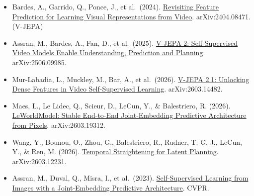 \vspace{0.25em}
\begin{itemize}
\tightlist
\item
  Bardes, A., Garrido, Q., Ponce, J., et al.~(2024). \href{https://arxiv.org/abs/2404.08471}{Revisiting Feature Prediction for Learning Visual Representations from Video}. arXiv:2404.08471. (V-JEPA)
\item
  Assran, M., Bardes, A., Fan, D., et al.~(2025). \href{https://arxiv.org/abs/2506.09985}{V-JEPA 2: Self-Supervised Video Models Enable Understanding, Prediction and Planning}. arXiv:2506.09985.
\item
  Mur-Labadia, L., Muckley, M., Bar, A., et al.~(2026). \href{https://arxiv.org/abs/2603.14482}{V-JEPA 2.1: Unlocking Dense Features in Video Self-Supervised Learning}. arXiv:2603.14482.
\item
  Maes, L., Le Lidec, Q., Scieur, D., LeCun, Y., \& Balestriero, R. (2026). \href{https://arxiv.org/abs/2603.19312}{LeWorldModel: Stable End-to-End Joint-Embedding Predictive Architecture from Pixels}. arXiv:2603.19312.
\item
  Wang, Y., Bounou, O., Zhou, G., Balestriero, R., Rudner, T. G. J., LeCun, Y., \& Ren, M. (2026). \href{https://arxiv.org/abs/2603.12231}{Temporal Straightening for Latent Planning}. arXiv:2603.12231.
\item
  Assran, M., Duval, Q., Misra, I., et al.~(2023). \href{https://arxiv.org/abs/2301.08243}{Self-Supervised Learning from Images with a Joint-Embedding Predictive Architecture}. CVPR.
\end{itemize}

\clearpage
